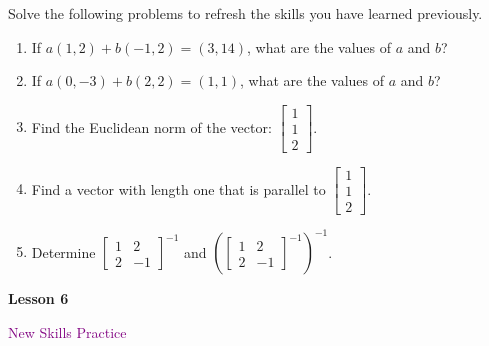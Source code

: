 \documentclass[10pt]{book}
\theoremstyle{definition}
\theoremstyle{remark}
\begin{document}
\begin{large}
\noindent
Solve the following problems to refresh the skills you have learned previously.
\begin{enumerate}
\item If $a(1,2) + b(-1,2) = (3,14)$, what are the values of $a$ and $b$?\vfil \vfil \vfil
\item If $a(0,-3) + b(2,2) = (1,1)$, what are the values of $a$ and $b$?\vfil \vfil \vfil
\item Find the Euclidean norm of the vector: $\begin{bmatrix}1 \\ 1 \\ 2 \end{bmatrix}$.\vfil \vfil\vfil
\item Find a vector with length one that is parallel to $\begin{bmatrix}1 \\ 1 \\ 2 \end{bmatrix}$. \vfil \vfil \vfil
\item Determine $\begin{bmatrix}1&2 \\ 2&-1 \end{bmatrix}^{-1}$ and $\left( \begin{bmatrix}1&2 \\ 2&-1 \end{bmatrix}^{-1}\right)^{-1}$. \vfil \vfil \vfil
\end{enumerate}
\end{large}
\newpage


\begin{tcolorbox}[
  width=\textwidth,
  colback=gray!10, %
  colframe=white, %
  boxrule=0pt,    %
  left=1cm,       %
  right=1cm,      %
  sharp corners  %
]

\begin{minipage}[t]{0.5\textwidth}
  \Huge \textbf{Lesson 6}
\end{minipage}%
\hfill
\begin{minipage}[t]{0.5\textwidth}
  \Huge\textcolor{purple}{New Skills Practice}
\end{minipage}
\end{tcolorbox}
\end{document}
